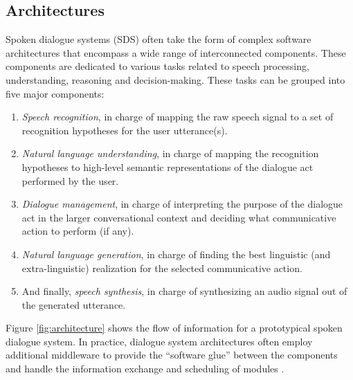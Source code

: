  \subsection{Architectures}
\label{sec:architectures}

Spoken dialogue systems (SDS) often take the form of complex software architectures that encompass a wide range of interconnected components. These components are dedicated to various tasks related to speech processing, understanding, reasoning and decision-making. These tasks can be grouped into five major components: 
\begin{enumerate}
\item \textit{Speech recognition}, in charge of mapping the raw speech signal to a set of recognition hypotheses for the user utterance(s).
\item \textit{Natural language understanding}, in charge of mapping the recognition hypotheses to high-level semantic representations of the dialogue act performed by the user.
\item \textit{Dialogue management}, in charge of interpreting the purpose of the dialogue act in the larger conversational context and deciding what communicative action to perform (if any).
\item \textit{Natural language generation}, in charge of finding the best linguistic (and extra-linguistic) realization for the selected communicative action.
\item And finally, \textit{speech synthesis}, in charge of synthesizing an audio signal out of the generated utterance.
 \end{enumerate}
 
 Figure \ref{fig:architecture} shows the flow of information for a prototypical spoken dialogue system. In practice, dialogue system architectures often employ additional middleware to provide the ``software glue'' between the components and handle the information exchange and scheduling of modules \citep{jaspis2004,Herzog:2004,Bohus:2009,schlangen2010}.
   
